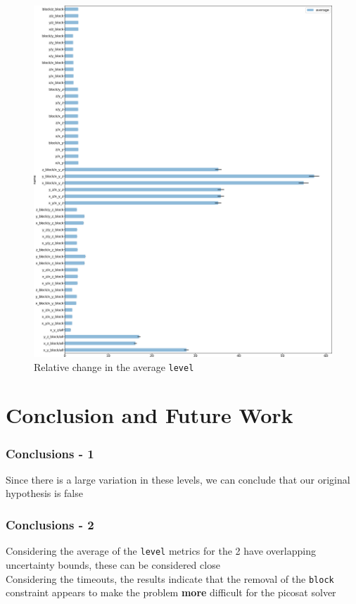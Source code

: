 \documentclass{beamer}
\begin{document}
\begin{frame}
	\begin{figure}
		\includegraphics[scale=0.2]{error_bars}
		\caption*{Relative change in the average \texttt{level}}
	\end{figure}
\end{frame}


\section{Conclusion and Future Work}

\begin{frame}
	\frametitle{Conclusions - 1}
	{\LARGE Since there is a \alert{large variation} in these levels, we can conclude that our original hypothesis is \alert{false}}
\end{frame}

\begin{frame}
\frametitle{Conclusions - 2}
{\Large Considering the average of the \texttt{level} metrics for the 2 have overlapping uncertainty bounds, these can be considered \alert{close}} \pause \\
{\Large Considering the timeouts, the results indicate that the \alert{removal of the \texttt{block} constraint} appears to make the problem \textbf{more} difficult for the picosat solver}
\end{frame}
\end{document}
